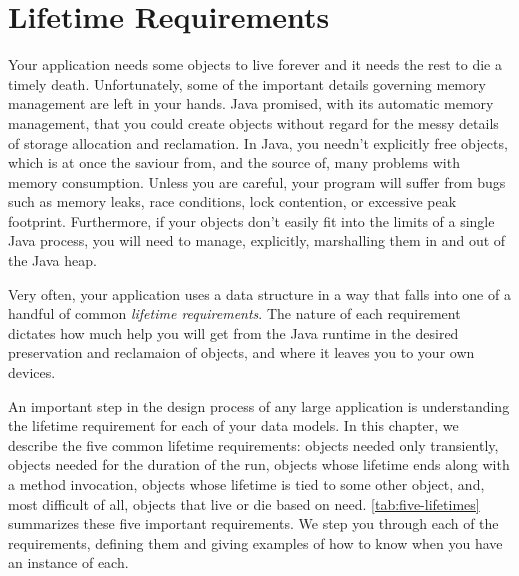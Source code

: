 \chapter{Lifetime Requirements}

Your application needs some objects to live forever and it needs the rest to die
a timely death. Unfortunately, some of the important details governing memory
management are left in your hands. Java promised, with its automatic memory
management, that you could create objects without regard for the messy details of
storage allocation and reclamation. In Java, you needn't explicitly free objects,
which is at once the saviour from, and the source of, many problems with memory
consumption. Unless you are careful, your program will suffer from bugs such as
memory leaks, race conditions, lock contention, or excessive
peak footprint. Furthermore, if your objects don't easily fit into the limits of
a single Java process, you will need to manage, explicitly, marshalling them in
and out of the Java heap.

Very often, your application uses a data structure in a way that falls into one
of a handful of common \emph{lifetime requirements}. The
nature of each requirement dictates how much help you will get from the Java runtime
in the desired preservation and reclamaion of objects, and where it leaves you to
your own devices. 

An important step in the design process of any large application is understanding
the lifetime requirement for each of your data models. In this chapter, we
describe the five common lifetime requirements: objects needed only transiently,
objects needed for the duration of the run, objects whose lifetime ends along
with a method invocation, objects whose lifetime is tied to some other object,
and, most difficult of all, objects that live or die based on need.
\autoref{tab:five-lifetimes} summarizes these five important requirements. We step
you through each of the requirements, defining them and giving examples of how to
know when you have an instance of each.

